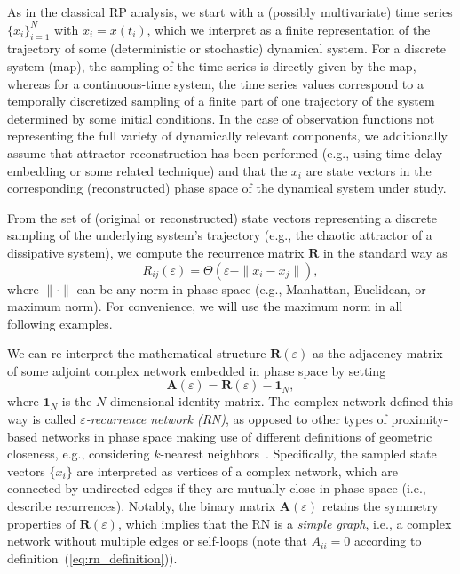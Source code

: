 

As in the classical RP analysis, we start with a (possibly multivariate) time series $\{x_i\}_{i=1}^N$ with $x_i=x(t_i)$, which we interpret as a finite representation of the trajectory of some (deterministic or stochastic) dynamical system. For a discrete system (map), the sampling of the time series is directly given by the map, whereas for a continuous-time system, the time series values correspond to a temporally discretized sampling of a finite part of one trajectory of the system determined by some initial conditions. In the case of observation functions not representing the full variety of dynamically relevant components, we additionally assume that attractor reconstruction has been performed (e.g., using time-delay embedding or some related technique) \cite{Fraser1986,kantz1997,Kennel1992,Takens1981} and that the $x_i$ are state vectors in the corresponding (reconstructed) phase space of the dynamical system under study. 

From the set of (original or reconstructed) state vectors representing a discrete sampling of the underlying system's trajectory (e.g., the chaotic attractor of a dissipative system), we compute the recurrence matrix $\textbf{R}$ in the standard way \cite{Eckmann1987,marwan2007} as
\begin{equation}
R_{ij}(\varepsilon)=\Theta(\varepsilon-\|x_i-x_j\|),
\end{equation}
\noindent
where $\|\cdot\|$ can be any norm in phase space (e.g., Manhattan, Euclidean, or maximum norm). For convenience, we will use the maximum norm in all following examples.

We can re-interpret the mathematical structure $\textbf{R}(\varepsilon)$ as the adjacency matrix of some adjoint complex network embedded in phase space by setting
\begin{equation}
\mathbf{A}(\varepsilon)=\mathbf{R}(\varepsilon)-\mathbf{1}_N,
\label{eq:rn_definition}
\end{equation}
\noindent
where $\mathbf{1}_N$ is the $N$-dimensional identity matrix. The complex network defined this way is called \emph{$\varepsilon$-recurrence network (RN)}, as opposed to other types of proximity-based networks in phase space making use of different definitions of geometric closeness, e.g., considering $k$-nearest neighbors~\cite{Donner2011IJBC}. Specifically, the sampled state vectors $\{x_i\}$ are interpreted as vertices of a complex network, which are connected by undirected edges if they are mutually close in phase space (i.e., describe recurrences). Notably, the binary matrix $\mathbf{A}(\varepsilon)$ retains the symmetry properties of $\mathbf{R}(\varepsilon)$, which implies that the RN is a \emph{simple graph}, i.e., a complex network without multiple edges or self-loops (note that $A_{ii}=0$ according to definition~(\ref{eq:rn_definition})). 



